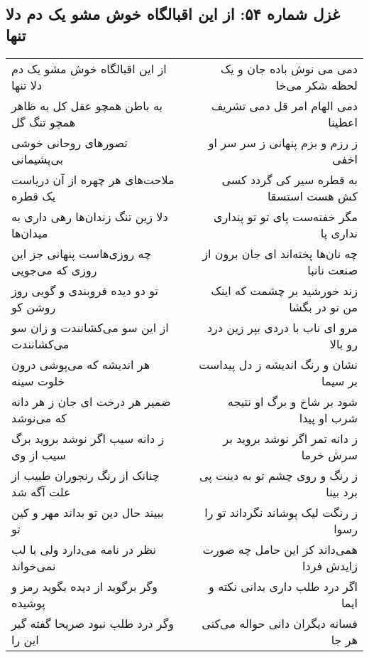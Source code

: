 \begin{center}
\section*{غزل شماره ۵۴: از این اقبالگاه خوش مشو یک دم دلا تنها}
\label{sec:0054}
\begin{longtable}{l p{0.5cm} r}
از این اقبالگاه خوش مشو یک دم دلا تنها
&&
دمی می نوش باده جان و یک لحظه شکر می‌خا
\\
به باطن همچو عقل کل به ظاهر همچو تنگ گل
&&
دمی الهام امر قل دمی تشریف اعطینا
\\
تصورهای روحانی خوشی بی‌پشیمانی
&&
ز رزم و بزم پنهانی ز سر سر او اخفی
\\
ملاحت‌های هر چهره از آن دریاست یک قطره
&&
به قطره سیر کی گردد کسی کش هست استسقا
\\
دلا زین تنگ زندان‌ها رهی داری به میدان‌ها
&&
مگر خفته‌ست پای تو تو پنداری نداری پا
\\
چه روزی‌هاست پنهانی جز این روزی که می‌جویی
&&
چه نان‌ها پخته‌اند ای جان برون از صنعت نانبا
\\
تو دو دیده فروبندی و گویی روز روشن کو
&&
زند خورشید بر چشمت که اینک من تو در بگشا
\\
از این سو می‌کشانندت و زان سو می‌کشانندت
&&
مرو ای ناب با دردی بپر زین درد رو بالا
\\
هر اندیشه که می‌پوشی درون خلوت سینه
&&
نشان و رنگ اندیشه ز دل پیداست بر سیما
\\
ضمیر هر درخت ای جان ز هر دانه که می‌نوشد
&&
شود بر شاخ و برگ او نتیجه شرب او پیدا
\\
ز دانه سیب اگر نوشد بروید برگ سیب از وی
&&
ز دانه تمر اگر نوشد بروید بر سرش خرما
\\
چنانک از رنگ رنجوران طبیب از علت آگه شد
&&
ز رنگ و روی چشم تو به دینت پی برد بینا
\\
ببیند حال دین تو بداند مهر و کین تو
&&
ز رنگت لیک پوشاند نگرداند تو را رسوا
\\
نظر در نامه می‌دارد ولی با لب نمی‌خواند
&&
همی‌داند کز این حامل چه صورت زایدش فردا
\\
وگر برگوید از دیده بگوید رمز و پوشیده
&&
اگر درد طلب داری بدانی نکته و ایما
\\
وگر درد طلب نبود صریحا گفته گیر این را
&&
فسانه دیگران دانی حواله می‌کنی هر جا
\\
\end{longtable}
\end{center}
